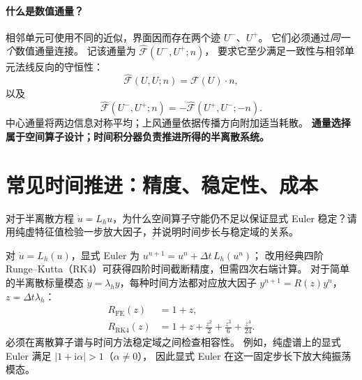 \documentclass[UTF8,11pt,openany]{ctexbook}
\numberwithin{equation}{chapter}
\theoremstyle{definition}
\theoremstyle{remark}
\begin{document}
\begin{center}
\end{center}

\paragraph{什么是数值通量？}
相邻单元可使用不同的近似，界面因而存在两个迹 $U^-$、$U^+$。
它们必须通过\emph{同一个}数值通量连接。
记该通量为 $\widehat{\mathcal F}(U^-,U^+;n)$，
要求它至少满足一致性与相邻单元法线反向的守恒性：
\begin{equation}
\widehat{\mathcal F}(U,U;n)=\mathcal F(U)\cdot n,
\end{equation}
以及
\begin{equation}
\widehat{\mathcal F}(U^-,U^+;n)
=-\widehat{\mathcal F}(U^+,U^-;-n).
\end{equation}
中心通量将两边信息对称平均；上风通量依据传播方向附加适当耗散。
\textbf{通量选择属于空间算子设计；时间积分器负责推进所得的半离散系统。}

\section{常见时间推进：精度、稳定性、成本}
\begin{checkpoint}
对于半离散方程 $\dot u=L_hu$，为什么空间算子守能仍不足以保证显式 Euler 稳定？请用纯虚特征值检验一步放大因子，并说明时间步长与稳定域的关系。
\end{checkpoint}
对 $\dot u=L_h(u)$，显式 Euler 为
$u^{n+1}=u^n+\Delta t\,L_h(u^n)$；
改用经典四阶 Runge--Kutta（RK4）可获得四阶时间截断精度，但需四次右端计算。
对于简单的半离散标量模态 $\dot y=\lambda_h y$，每种时间方法都对应放大因子
$y^{n+1}=R(z)y^n$，$z=\Delta t\lambda_h$：
\begin{align}
R_{\mathrm{FE}}(z)&=1+z,\\
R_{\mathrm{RK4}}(z)&=1+z+\frac{z^2}{2}+\frac{z^3}{6}+\frac{z^4}{24}.
\end{align}
必须在离散算子谱与时间方法稳定域之间检查相容性。
例如，纯虚谱上的显式 Euler 满足 $|1+\mathrm i\alpha|>1$（$\alpha\ne0$），
因此显式 Euler 在这一固定步长下放大纯振荡模态。
\end{document}
